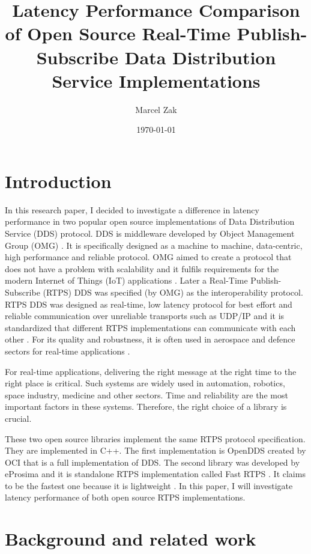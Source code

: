 \documentclass{csfourzero}
\title{Latency Performance Comparison of Open Source Real-Time Publish-Subscribe Data Distribution Service Implementations}
\author{Marcel Zak}
\date{\today}
\begin{document}
\maketitle


\section{Introduction}
\label{sec:intro}

\quad In this research paper, I decided to investigate a difference in latency performance in two popular open source implementations of Data Distribution Service (DDS) protocol. DDS is middleware developed by Object Management Group (OMG) \cite{what-is-dds}. It is specifically designed as a machine to machine, data-centric, high performance and reliable protocol. OMG aimed to create a protocol that does not have a problem with scalability and it fulfils requirements for the modern Internet of Things (IoT) applications \cite{DDS-spec}. Later a Real-Time Publish-Subscribe (RTPS) DDS was specified (by OMG) as the interoperability protocol. RTPS DDS was designed as real-time, low latency protocol for best effort and reliable communication over unreliable transports such as UDP/IP and it is standardized that different RTPS implementations can communicate with each other \cite{RTPS-spec}. For its quality and robustness, it is often used in aerospace and defence sectors for real-time applications \cite{eprosima-rtps-intro}. 

For real-time applications, delivering the right message at the right time to the right place is critical. Such systems are widely used in automation, robotics, space industry, medicine and other sectors. Time and reliability are the most important factors in these systems. Therefore, the right choice of a library is crucial. 

These two open source libraries implement the same RTPS protocol specification. They are implemented in C++. The first implementation is OpenDDS \cite{git-openDDS} created by OCI that is a full implementation of DDS. The second library was developed by eProsima and it is standalone RTPS implementation called Fast RTPS \cite{git-eProsima}. It claims to be the fastest one because it is lightweight \cite{eprosima-rtps-intro}. In this paper, I will investigate latency performance of both open source RTPS implementations.

\section{Background and related work}
\label{sec:lit}
\end{document}
